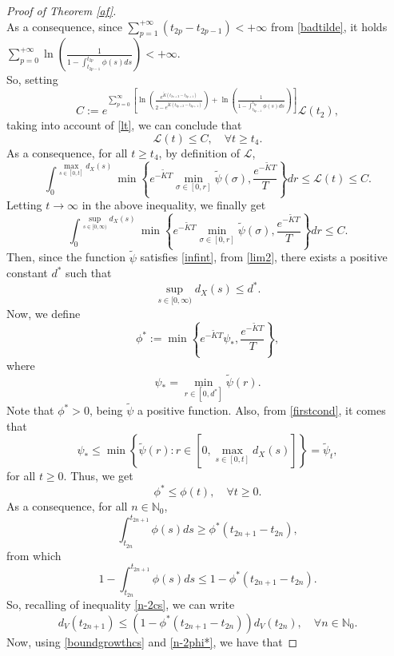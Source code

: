 \documentclass[10pt,a4paper]{amsart}
\begin{document}
\begin{proof}[Proof of Theorem \ref{af}]
$$$$
	As a consequence, since $\sum_{p=1}^{+\infty}(t_{2p}-t_{2p-1})<+\infty$ from \eqref{badtilde}, it holds $\sum_{p=0}^{+\infty}\ln\left(\frac{1}{1-\int_{t_{2p-1}}^{t_{2p}}\phi(s)ds}\right)<+\infty$.
	\\So, setting $$C:=e^{\sum_{p=0}^{\infty}\left[\ln\left(\frac{e^{\tilde K(t_{2n+2}-t_{2p+1})}}{2-e^{\tilde K(t_{2p+2}-t_{2p+1})}}\right)+\ln\left(\frac{1}{1-\int_{t_{2p-1}}^{t_{2p}}\phi(s)ds}\right)\right]}\mathcal{L}(t_2),$$
	taking into account of \eqref{lt}, we can conclude that
	\begin{equation}\label{lia5}
		\mathcal{L}(t)\leq C,\quad \forall t\geq t_4.
	\end{equation}
	As a consequence, for all $t\geq t_4$, by definition of $\mathcal{L}$,
	$$\int_{0}^{\underset{s\in [0,t]}{\max}d_{X}(s)}\min\left\{e^{-\tilde KT}\min_{\sigma\in [0,r]}\tilde\psi(\sigma),\frac{e^{-\tilde KT}}{T}\right\}dr\leq \mathcal{L}(t)\leq C.$$ 
	Letting $t\to \infty$ in the above inequality, we finally get \begin{equation}\label{lim2}
		\int_{0}^{\underset{s\in [0,\infty)}{\sup}d_{X}(s)}\min\left\{e^{-\tilde KT}\min_{\sigma\in [0,r]}\tilde\psi(\sigma),\frac{e^{-\tilde KT}}{T}\right\}dr\leq C.
	\end{equation} 
	Then, since the function $\tilde \psi$ satisfies  \eqref{infint}, from \eqref{lim2}, there exists a positive constant $d^{*}$ such that \begin{equation}\label{firstcond}
		\underset{s\in [0,\infty)}{\sup}d_{X}(s)\leq d^{*}.
	\end{equation}
	Now, we define
	$$\phi^{*}:=\min\left\{e^{-\tilde KT}\psi_{*},\frac{e^{-\tilde KT}}{T}\right\},$$
	where $$\psi_{*}=\min_{r\in[0,d^{*}]}\tilde\psi(r).$$
	Note that $\phi^{*}>0$, being $\tilde\psi$ a positive function. Also, from \eqref{firstcond}, it comes that $$\psi_{*}\leq \min\left\{\tilde\psi(r):r\in \left[0,\max_{s\in [0,t]}d_{X}(s)\right]\right\}=\tilde\psi_{t},$$
	for all $t\geq 0$. Thus, we get $$\phi^{*}\leq \phi(t), \quad \forall t\geq 0.$$
	As a consequence, for all $n\in \mathbb{N}_0$, $$\int_{t_{2n}}^{t_{2n+1}}\phi(s)ds\geq \phi^*(t_{2n+1}-t_{2n}),$$
	from which 
	$$1-\int_{t_{2n}}^{t_{2n+1}}\phi(s)ds\leq 1-\phi^*(t_{2n+1}-t_{2n}).$$
	So, recalling of inequality \eqref{n-2cs}, we can write
	\begin{equation}\label{n-2phi*}
		d_V(t_{2n+1})\leq \left(1-\phi^*(t_{2n+1}-t_{2n})\right)d_V(t_{2n}),\quad\forall n \in \mathbb{N}_0.
	\end{equation}
	Now, using \eqref{boundgrowthcs} and \eqref{n-2phi*}, we have that

\end{proof}
\end{document}
